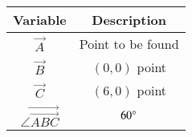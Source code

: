\begin{tabular}[12pt]{ |c| c|}
    \hline
    \textbf{Variable} & \textbf{Description}\\ 
    \hline
	$\vec{A}$ & Point to be found\\
    \hline
	$\vec{B}$ & $(0, 0)$ point\\
    \hline
	$\vec{C}$ & $(6, 0)$ point\\
    \hline
	$\vec{\angle \vec{ABC}}$ & $60 \degree$\\ 
    \hline
    \end{tabular}